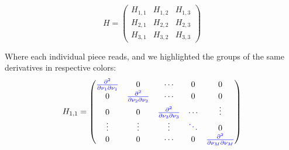\documentclass[11pt]{book}
\begin{document}
\begin{equation}
H = 
\begin{pmatrix}
H_{1,1} & H_{1,2}    & H_{1,3}  \\
H_{2,1}   &  H_{2,2}   & H_{2,3}\\
H_{3,1}      & H_{3,2}       &  H_{3,3}
\end{pmatrix}
\end{equation}

Where each individual piece reads, and we highlighted the groups of the same derivatives in respective colors:
\begin{equation}
H_{1,1} = 
\begin{pmatrix}
\textcolor{blue}{\frac{\partial^2 } {\partial \nu_1 \partial \nu_1 }} & 0       & \cdots & 0 & 0       \\
0      & \textcolor{blue}{\frac{\partial^2 } {\partial \nu_2 \partial \nu_2 }}
  & \cdots      &  0 & 0       \\
0      & 0       &  \textcolor{blue}{\frac{\partial^2 } {\partial \nu_3 \partial \nu_3 }}
     & \cdots & \vdots  \\
\vdots & \vdots  & \vdots & \textcolor{blue}{\ddots} & 0       \\
0      & 0       & \cdots & 0      & \textcolor{blue}{\frac{\partial^2 } {\partial \nu_M \partial \nu_M }}
\end{pmatrix}
\end{equation}
\end{document}
